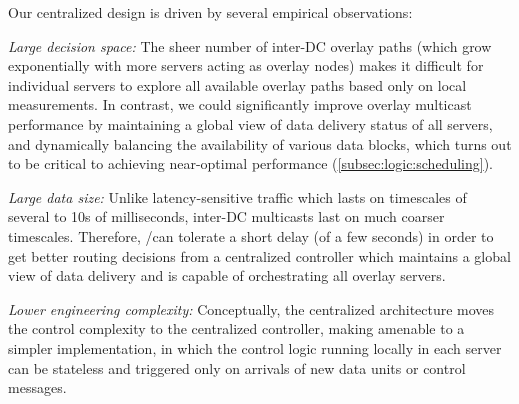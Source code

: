 Our centralized design is driven by several empirical observations:
\begin{packedenumerate}

\item {\em Large decision space:}
The sheer number of inter-DC overlay paths (which grow exponentially
with more servers acting as overlay nodes) makes it difficult for
individual servers to explore all available overlay paths based only
on local measurements. In contrast, we could significantly improve
overlay multicast performance by maintaining a global view of data
delivery status of all servers, and dynamically balancing the
availability of various data blocks, which turns out to be critical
to achieving near-optimal performance
(\Section\ref{subsec:logic:scheduling}).

\item {\em Large data size:}
Unlike latency-sensitive traffic which lasts
on timescales of several to 10s of milliseconds, inter-DC multicasts
last on much coarser timescales.
Therefore, \name/\newname can tolerate a short delay (of a few seconds) in order
to get better routing decisions from a centralized controller which
maintains a global view of data delivery and is capable of orchestrating
all overlay servers.


\item {\em Lower engineering complexity:}
Conceptually, the centralized architecture moves the control
complexity to the centralized controller, making \name amenable to a
simpler implementation, in which the control logic running locally in
each server can be stateless and triggered only on arrivals of new
data units or control messages.

\end{packedenumerate}

